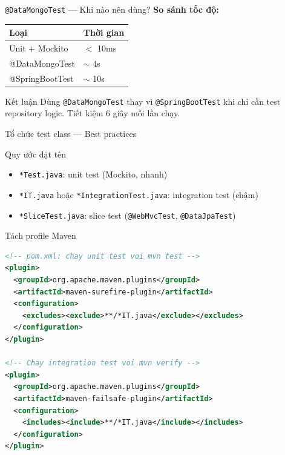 \documentclass[aspectratio=169,10pt]{beamer}
\begin{document}
\begin{frame}[fragile]{\texttt{@DataMongoTest} --- Khi nào nên dùng?}
    \textbf{So sánh tốc độ:}
    \begin{center}
    \small
    \begin{tabular}{ll}
      \toprule
      \textbf{Loại} & \textbf{Thời gian} \\
      \midrule
      Unit + Mockito    & $<$ 10ms \\
      @DataMongoTest    & $\sim$ 4s \\
      @SpringBootTest   & $\sim$ 10s \\
      \bottomrule
    \end{tabular}
    \end{center}

    \vspace{0.5em}
    \begin{exampleblock}{Kết luận}
      Dùng \texttt{@DataMongoTest} thay vì \texttt{@SpringBootTest}
      khi chỉ cần test repository logic.
      Tiết kiệm 6 giây mỗi lần chạy.
    \end{exampleblock}
\end{frame}

\begin{frame}[fragile]{Tổ chức test class --- Best practices}
  \begin{block}{Quy ước đặt tên}
    \begin{itemize}
      \item \texttt{*Test.java}: unit test (Mockito, nhanh)
      \item \texttt{*IT.java} hoặc \texttt{*IntegrationTest.java}: integration test (chậm)
      \item \texttt{*SliceTest.java}: slice test (\texttt{@WebMvcTest}, \texttt{@DataJpaTest})
    \end{itemize}
  \end{block}

  \begin{block}{Tách profile Maven}
\begin{lstlisting}[language=XML,style=small]
<!-- pom.xml: chay unit test voi mvn test -->
<plugin>
  <groupId>org.apache.maven.plugins</groupId>
  <artifactId>maven-surefire-plugin</artifactId>
  <configuration>
    <excludes><exclude>**/*IT.java</exclude></excludes>
  </configuration>
</plugin>

<!-- Chay integration test voi mvn verify -->
<plugin>
  <groupId>org.apache.maven.plugins</groupId>
  <artifactId>maven-failsafe-plugin</artifactId>
  <configuration>
    <includes><include>**/*IT.java</include></includes>
  </configuration>
</plugin>
\end{lstlisting}
  \end{block}
\end{frame}
\end{document}
